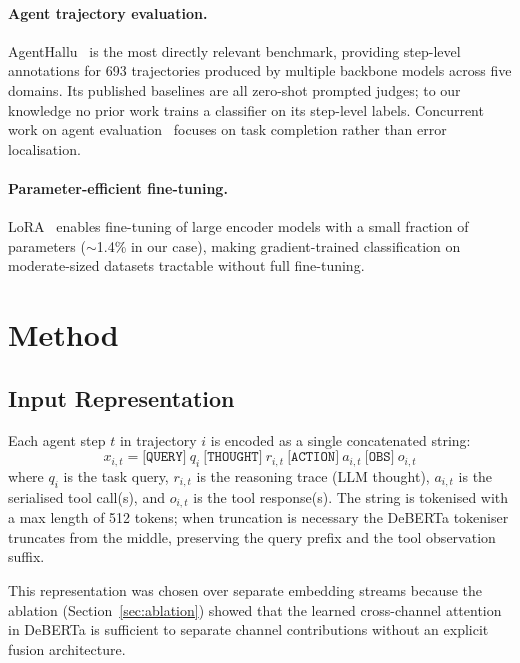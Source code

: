 \documentclass[11pt]{article}
\begin{document}
\paragraph{Agent trajectory evaluation.} AgentHallu~\citep{agenthallu} is the most directly relevant benchmark, providing step-level annotations for 693 trajectories produced by multiple backbone models across five domains. Its published baselines are all zero-shot prompted judges; to our knowledge no prior work trains a classifier on its step-level labels. Concurrent work on agent evaluation~\citep{agentbench, tau_bench} focuses on task completion rather than error localisation.

\paragraph{Parameter-efficient fine-tuning.} LoRA~\citep{lora} enables fine-tuning of large encoder models with a small fraction of parameters ($\sim$1.4\% in our case), making gradient-trained classification on moderate-sized datasets tractable without full fine-tuning.

\section{Method}

\subsection{Input Representation}

Each agent step $t$ in trajectory $i$ is encoded as a single concatenated string:
\begin{equation}
  x_{i,t} = \texttt{[QUERY]}\ q_i\ \texttt{[THOUGHT]}\ r_{i,t}\ \texttt{[ACTION]}\ a_{i,t}\ \texttt{[OBS]}\ o_{i,t}
\end{equation}
where $q_i$ is the task query, $r_{i,t}$ is the reasoning trace (LLM thought), $a_{i,t}$ is the serialised tool call(s), and $o_{i,t}$ is the tool response(s). The string is tokenised with a max length of 512 tokens; when truncation is necessary the DeBERTa tokeniser truncates from the middle, preserving the query prefix and the tool observation suffix.

This representation was chosen over separate embedding streams because the ablation (Section~\ref{sec:ablation}) showed that the learned cross-channel attention in DeBERTa is sufficient to separate channel contributions without an explicit fusion architecture.
\end{document}
